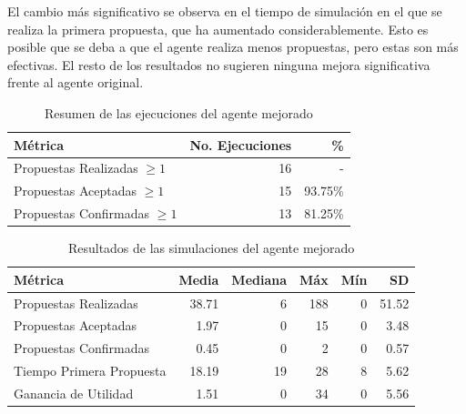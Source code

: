 \documentclass[12pt]{article}
\begin{document}
El cambio más significativo se observa en el tiempo de simulación en el que se realiza la primera propuesta, que ha aumentado considerablemente. Esto es posible que se deba a que el agente realiza menos propuestas, pero estas son más efectivas. El resto de los resultados no sugieren ninguna mejora significativa frente al agente original.

\begin{table}[h]
    \centering
    \begin{tabular}{|l|r|r|}
        \hline
        \textbf{Métrica}                & \textbf{No. Ejecuciones} & \textbf{\%} \\
        \hline
        Propuestas Realizadas $\geq 1$  & 16                       & -           \\
        \hline
        Propuestas Aceptadas $\geq 1$   & 15                       & 93.75\%     \\
        \hline
        Propuestas Confirmadas $\geq 1$ & 13                       & 81.25\%     \\
        \hline
    \end{tabular}
    \caption{Resumen de las ejecuciones del agente mejorado}
    \label{tab:summary2}
\end{table}

\begin{table}[h]
    \centering
    \begin{tabular}{|l|r|r|r|r|r|}
        \hline
        \textbf{Métrica}         & \textbf{Media} & \textbf{Mediana} & \textbf{Máx} & \textbf{Mín} & \textbf{SD} \\
        \hline
        Propuestas Realizadas    & 38.71          & 6                & 188          & 0            & 51.52       \\
        \hline
        Propuestas Aceptadas     & 1.97           & 0                & 15           & 0            & 3.48        \\
        \hline
        Propuestas Confirmadas   & 0.45           & 0                & 2            & 0            & 0.57        \\
        \hline
        Tiempo Primera Propuesta & 18.19          & 19               & 28           & 8            & 5.62        \\
        \hline
        Ganancia de Utilidad     & 1.51           & 0                & 34           & 0            & 5.56        \\
        \hline
    \end{tabular}
    \caption{Resultados de las simulaciones del agente mejorado}
    \label{tab:results2}
\end{table}
\end{document}

